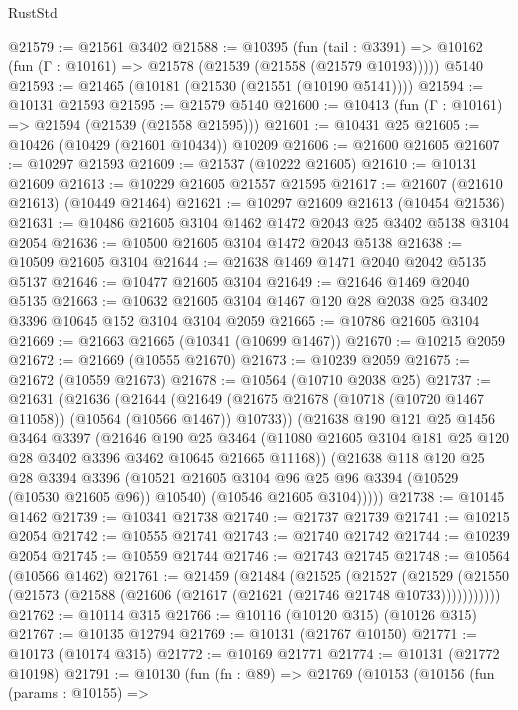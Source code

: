 \begin{lexlean}{RustStd}
\begin{coremodule}
@21579 := @21561 @3402
@21588 := @10395
    (fun (tail : @3391) => @10162 (fun (Γ : @10161) => @21578 (@21539 (@21558 (@21579 @10193)))))
    @5140
@21593 := @21465 (@10181 (@21530 (@21551 (@10190 @5141))))
@21594 := @10131 @21593
@21595 := @21579 @5140
@21600 := @10413 (fun (Γ : @10161) => @21594 (@21539 (@21558 @21595)))
@21601 := @10431 @25
@21605 := @10426 (@10429 (@21601 @10434)) @10209
@21606 := @21600 @21605
@21607 := @10297 @21593
@21609 := @21537 (@10222 @21605)
@21610 := @10131 @21609
@21613 := @10229 @21605 @21557 @21595
@21617 := @21607 (@21610 @21613) (@10449 @21464)
@21621 := @10297 @21609 @21613 (@10454 @21536)
@21631 := @10486 @21605 @3104 @1462 @1472 @2043 @25 @3402 @5138 @3104 @2054
@21636 := @10500 @21605 @3104 @1472 @2043 @5138
@21638 := @10509 @21605 @3104
@21644 := @21638 @1469 @1471 @2040 @2042 @5135 @5137
@21646 := @10477 @21605 @3104
@21649 := @21646 @1469 @2040 @5135
@21663 := @10632 @21605 @3104 @1467 @120 @28 @2038 @25 @3402 @3396 @10645 @152 @3104 @3104 @2059
@21665 := @10786 @21605 @3104
@21669 := @21663 @21665 (@10341 (@10699 @1467))
@21670 := @10215 @2059
@21672 := @21669 (@10555 @21670)
@21673 := @10239 @2059
@21675 := @21672 (@10559 @21673)
@21678 := @10564 (@10710 @2038 @25)
@21737 := @21631
    (@21636
      (@21644
        (@21649 (@21675 @21678 (@10718 (@10720 @1467 @11058)) (@10564 (@10566 @1467)) @10733))
        (@21638
          @190
          @121
          @25
          @1456
          @3464
          @3397
          (@21646
            @190
            @25
            @3464
            (@11080 @21605 @3104 @181 @25 @120 @28 @3402 @3396 @3462 @10645 @21665 @11168))
          (@21638
            @118
            @120
            @25
            @28
            @3394
            @3396
            (@10521 @21605 @3104 @96 @25 @96 @3394 (@10529 (@10530 @21605 @96)) @10540)
            (@10546 @21605 @3104)))))
@21738 := @10145 @1462
@21739 := @10341 @21738
@21740 := @21737 @21739
@21741 := @10215 @2054
@21742 := @10555 @21741
@21743 := @21740 @21742
@21744 := @10239 @2054
@21745 := @10559 @21744
@21746 := @21743 @21745
@21748 := @10564 (@10566 @1462)
@21761 := @21459
    (@21484
      (@21525
        (@21527
          (@21529 (@21550 (@21573 (@21588 (@21606 (@21617 (@21621 (@21746 @21748 @10733)))))))))))
@21762 := @10114 @315
@21766 := @10116 (@10120 @315) (@10126 @315)
@21767 := @10135 @12794
@21769 := @10131 (@21767 @10150)
@21771 := @10173 (@10174 @315)
@21772 := @10169 @21771
@21774 := @10131 (@21772 @10198)
@21791 := @10130
    (fun (fn : @89) =>
    @21769
      (@10153
        (@10156
          (fun (params : @10155) =>

\end{coremodule}
\end{lexlean}
